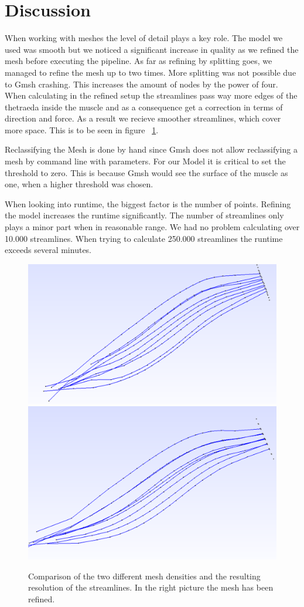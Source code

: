 \documentclass[preprint,journal]{vgtc}       %
\begin{document}
\section{Discussion}
When working with meshes the level of detail plays a key role. 
The model we used was smooth but we noticed a significant increase in quality as we refined the mesh before executing the pipeline. 
As far as refining by splitting goes, we managed to refine the mesh up to two times. 
More splitting was not possible due to Gmsh crashing. 
This increases the amount of nodes by the power of four.
When calculating in the refined setup the streamlines pass way more edges of the thetraeda inside the muscle and as a consequence get a correction in terms of direction and force. 
As a result we recieve smoother streamlines, which cover more space. 
This is to be seen in figure ~\ref{fig:refStreamlines}.

Reclassifying the Mesh is done by hand since Gmsh does not allow reclassifying a mesh by command line with parameters. 
For our Model it is critical to set the threshold to zero. 
This is because Gmsh would see the surface of the muscle as one, when a higher threshold was chosen.

When looking into runtime, the biggest factor is the number of points.
Refining the model increases the runtime significantly. 
The number of streamlines only plays a minor part when in reasonable range.
We had no problem calculating over 10.000 streamlines. When trying to calculate 250.000 streamlines the runtime exceeds several minutes.

\begin{figure}
	
	\begin{minipage}{\linewidth}
		\includegraphics[width=.5\linewidth]{Streamlines.PNG}
		\includegraphics[width=.51\linewidth]{refStreamlines.PNG}
		\caption{Comparison of the two different mesh densities and the resulting resolution of the streamlines. In the right picture the mesh has been refined.}
		\label{fig:refStreamlines}
	\end{minipage}
\end{figure}
\end{document}
